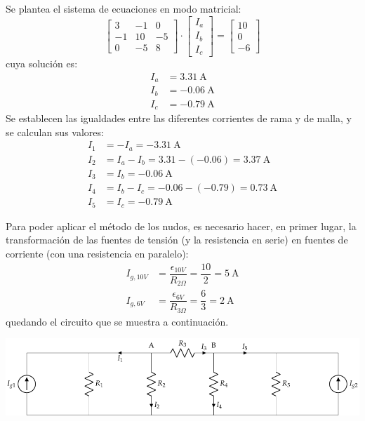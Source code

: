 Se plantea el sistema de ecuaciones en modo matricial:
\begin{equation*}
  \begin{bmatrix}
    3 & -1 & 0 \\
    -1 & 10 & -5 \\
    0 & -5 & 8
  \end{bmatrix} \cdot
  \begin{bmatrix}
    I_a\\
    I_b\\
    I_c
  \end{bmatrix} = %
  \begin{bmatrix}
    10 \\
    0\\
    -6
  \end{bmatrix}
\end{equation*}
cuya solución es:
\begin{align*}
  I_a&=\qty{3.31}{\ampere}\\
  I_b&=\qty{-0.06}{\ampere}\\
  I_c&= \qty{-0.79}{\ampere}
\end{align*}
Se establecen las igualdades entre las diferentes corrientes de rama y
de malla, y se calculan sus valores:
\begin{align*}
  I_1&=-I_a=\qty{-3.31}{\ampere}\\
  I_2&=I_a-I_b=3.31-(-0.06)=\qty{3.37}{\ampere}\\
  I_3&=I_b=\qty{-0.06}{\ampere}\\
  I_4&=I_b-I_c=-0.06-(-0.79)=\qty{0.73}{\ampere}\\
  I_5&=I_c=\qty{-0.79}{\ampere}
\end{align*}
	
Para poder aplicar el método de los nudos, es necesario hacer, en
primer lugar, la transformación de las fuentes de tensión (y la
resistencia en serie) en fuentes de corriente (con una resistencia en
paralelo):
\begin{align*}
  I_{g,10V}&=\dfrac{\epsilon_{10V}}{R_{2\Omega}}=\dfrac{10}{2}=\qty{5}{\ampere}\\
  I_{g,6V}&=\dfrac{\epsilon_{6V}}{R_{3\Omega}}=\dfrac{6}{3}=\qty{2}{\ampere}
\end{align*}
quedando el circuito que se muestra a continuación.

\begin{center}
  \includegraphics{figuras/BT1_08_nudos.pdf}
\end{center}

